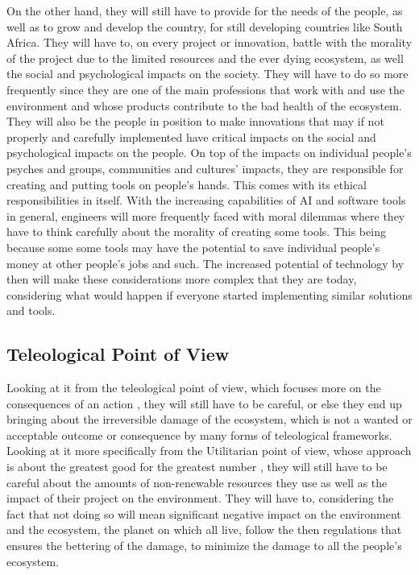 \documentclass[12pt]{witseiepaper}
\begin{document}
    On the other hand, they will still have to provide for the needs of the people, as well as to grow and develop the country, for still developing countries like South Africa. They will have to, on every project or innovation, battle with the morality of the project due to the limited resources and the ever dying ecosystem, as well the social and psychological impacts on the society. They will have to do so more frequently since they are one of the main professions that work with and use the environment and whose products contribute to the bad health of the ecosystem. They will also be the people in position to make innovations that may if not properly and carefully implemented have critical impacts on the social and psychological impacts on the people. On top of the impacts on individual people's psyches and groups, communities and cultures' impacts, they are responsible for creating and putting tools on people's hands. This comes with its ethical responsibilities in itself. With the increasing capabilities of AI and software tools in general, engineers will more frequently faced with moral dilemmas where they have to think carefully about the morality of creating some tools. This being because some some tools may have the potential to save individual people's money at other people's jobs and such. The increased potential of technology by then will make these considerations more complex that they are today, considering what would happen if everyone started implementing similar solutions and tools.   

    \subsection{Teleological Point of View} 

    Looking at it from the teleological point of view, which focuses more on the consequences of an action \cite{ismail2018narrative}, they will still have to be careful, or else they end up bringing about the irreversible damage of the ecosystem, which is not a wanted or acceptable outcome or consequence by many forms of teleological frameworks. 
    Looking at it more specifically from the Utilitarian point of view, whose approach is about the greatest good for the greatest number \cite{ismail2018narrative, ethicsunwrapped}, they will still have to be careful about the amounts of non-renewable resources they use as well as the impact of their project on the environment. They will have to, considering the fact that not doing so will mean significant negative impact on the environment and the ecosystem, the planet on which all live, follow the then regulations that ensures the bettering of the damage, to minimize the damage to all the people’s ecosystem. 
\end{document}
